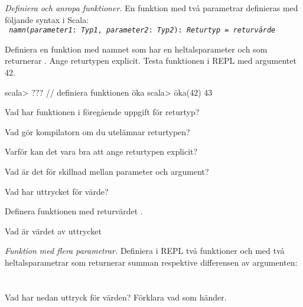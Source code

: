 
\Exercise{\ExeWeekTHREE}

\begin{Goals}
\item 
\end{Goals}

\begin{Preparations}
\item 
\end{Preparations}

\BasicTasks %

\Task \label{task:funcall}\emph{Definiera och anropa funktioner.} En funktion med två parametrar definieras med följande syntax i Scala: \vspace{0.5em} \\  \texttt{ \textit{namn}(\textit{parameter1}: \textit{Typ1}, \textit{parameter2}: \textit{Typ2}): \textit{Returtyp} = \textit{returvärde}}

\Subtask Definiera en funktion med namnet  som har en heltalsparameter  och som returnerar . Ange returtypen explicit. Testa funktionen i REPL med argumentet 42.

\begin{REPL}
scala> ???  // definiera funktionen öka
scala> öka(42)
43
\end{REPL}

\Subtask\Pen Vad har funktionen  i föregående uppgift för returtyp?

\Subtask\Pen Vad gör kompilatorn om du utelämnar returtypen?

\Subtask\Pen Varför kan det vara bra att ange returtypen explicit?

\Subtask\Pen Vad är det för skillnad mellan parameter och argument?
 
\Subtask Vad har uttrycket  för värde?

\Subtask Definera funktionen  med returvärdet .

\Subtask Vad är värdet av uttrycket 


\Task \emph{Funktion med flera parametrar.} Definiera i REPL två funktioner  och  med två heltalsparametrar som returnerar summan respektive differensen av argumenten: \\
 \\
 \\
Vad har nedan uttryck för värden? Förklara vad som händer.

